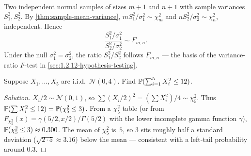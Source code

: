 \begin{example}
\label{ex:f-test-setup}
Two independent normal samples of sizes $m + 1$ and $n + 1$ with
sample variances $S_1^2, S_2^2$. By
\cref{thm:sample-mean-variance}, $m S_1^2/\sigma_1^2 \sim \chi^2_m$
and $n S_2^2/\sigma_2^2 \sim \chi^2_n$, independent. Hence
\[
  \frac{S_1^2/\sigma_1^2}{S_2^2/\sigma_2^2} \sim F_{m, n}.
\]
Under the null $\sigma_1^2 = \sigma_2^2$, the ratio $S_1^2/S_2^2$
follows $F_{m, n}$ — the basis of the variance-ratio
$F$-test in \cref{sec:1.2.12-hypothesis-testing}.
\end{example}

\begin{problem}
\label{prob:chi2-quantile}
Suppose $X_1, \dots, X_5$ are i.i.d.\ $\mathcal{N}(0, 4)$. Find
$\mathbb{P}(\sum_{i=1}^{5} X_i^2 \leq 12)$.
\end{problem}

\begin{proof}[Solution]
$X_i / 2 \sim \mathcal{N}(0, 1)$, so $\sum (X_i/2)^2 = (\sum X_i^2)/4 \sim \chi^2_5$.
Thus $\mathbb{P}(\sum X_i^2 \leq 12) = \mathbb{P}(\chi^2_5 \leq 3)$. From a
$\chi^2_5$ table (or from
$F_{\chi^2_5}(x) = \gamma(5/2, x/2)/\Gamma(5/2)$ with the lower
incomplete gamma function $\gamma$),
$\mathbb{P}(\chi^2_5 \leq 3) \approx 0.300$. The mean of $\chi^2_5$
is~$5$, so $3$ sits roughly half a standard deviation
($\sqrt{2 \cdot 5} \approx 3.16$) below the mean — consistent
with a left-tail probability around $0.3$.
\end{proof}
